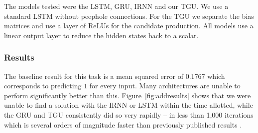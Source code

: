 The models tested were the LSTM, GRU, IRNN \autocite{Le2015} and our TGU. We use a standard LSTM without
peephole connections. For the TGU we separate the bias matrices and use a layer of ReLUs for the candidate
production. All models use a linear output layer to reduce the hidden states back to a scalar.

\subsubsection{Results}
The baseline result for this task is a mean squared error of \(0.1767\) which corresponds to predicting
\(1\) for every input. Many architectures are unable to perform significantly better than this.
Figure~\ref{fig:addresults} shows that we were unable to find a solution with the IRNN or LSTM within
the time allotted, while the GRU and TGU consistently did so very rapidly -- in less than 1,000
iterations which is several orders of magnitude faster than previously published results 
\autocite{Le2015, Arjovsky2015, Henaff2016}.

